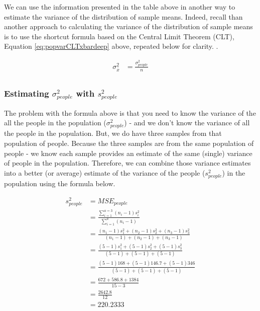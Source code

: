 \documentclass[
]{krantz}
\begin{document}
We can use the information presented in the table above in another way to estimate the variance of the distribution of sample means. Indeed, recall than another approach to calculating the variance of the distribution of sample means is to use the shortcut formula based on the Central Limit Theorem (CLT), Equation \eqref{eq:popvarCLTxbardeep} above, repeated below for clarity.
.

\[
\begin{aligned}
\sigma_{\bar{x}}^2 &= \frac{\sigma_{people}^2}{n}\\
\end{aligned}
\]

\hypertarget{estimating-sigma_people2-with-s_people2}{%
\subsubsection{\texorpdfstring{Estimating \(\sigma_{people}^2\) with \(s_{people}^2\)}{Estimating \textbackslash sigma\_\{people\}\^{}2 with s\_\{people\}\^{}2}}\label{estimating-sigma_people2-with-s_people2}}

The problem with the formula above is that you need to know the variance of the all the people in the population (\(\sigma_{people}^2\)) - and we don't know the variance of all the people in the population. But, we do have three samples from that population of people. Because the three samples are from the same population of people - we know each sample provides an estimate of the same (single) variance of people in the population. Therefore, we can combine those variance estimates into a better (or average) estimate of the variance of the people (\(s_{people}^2\)) in the population using the formula below.

\[
\begin{aligned}
s_{people}^2 &= MSE_{people}\\
&= \frac{\sum_{i=1}^{a=3}(n_i-1)s_i^2}{\sum_{i=1}^{a}(n_i-1)} \\
&= \frac{(n_1-1)s_1^2 + (n_2-1)s_2^2 + (n_3-1)s_3^2}{(n_1-1)+(n_2-1)+(n_3-1)} \\
&= \frac{(5-1)s_1^2 + (5-1)s_2^2 + (5-1)s_3^2}{(5-1)+(5-1)+(5-1)} \\
&= \frac{(5-1)168 + (5-1)146.7 +(5-1)346}{(5-1) + (5-1) + (5-1)} \\
&= \frac{672 + 586.8 + 1384}{15 -3} \\
&= \frac{2642.8}{12} \\
&= 220.2333 \\
\end{aligned}
\]
\end{document}
